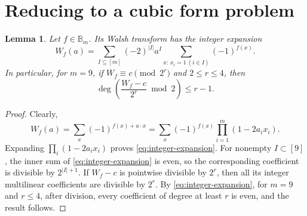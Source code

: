 \documentclass[11pt]{article}
\newtheorem{lemma}{Lemma}
\newtheorem{open problem}{Open problem}
\begin{document}
\section{Reducing to a cubic form problem}
\begin{lemma}\label{lem:residue}
Let $f\in \mathbb{B}_m$. Its Walsh transform has the integer expansion
\begin{equation}\label{eq:integer-expansion}
W_f(a)=\sum_{I\subseteq[m]}(-2)^{|I|}a^I
                 \sum_{x:\,x_i=1\ (i\in I)}(-1)^{f(x)}.
\end{equation}
In particular, for $m=9$, if $W_f\equiv c\pmod{2^r}$ and $2\le r\le4$, then
\begin{equation}\label{eq:residue-degree}
\deg\left(\frac{W_f-c}{2^r}\bmod2\right)\le r-1.
\end{equation}
\end{lemma}
\begin{proof}
Clearly,
\[
W_f(a)=\sum_x(-1)^{f(x)+a\cdot x}=\sum_x(-1)^{f(x)}\prod_{i=1}^m(1-2a_ix_i).
\]
Expanding $\prod_i(1-2a_ix_i)$ proves \eqref{eq:integer-expansion}. For nonempty $I\subset[9]$, the inner sum of \eqref{eq:integer-expansion} is even, so the corresponding coefficient is divisible by $2^{|I|+1}$.
If $W_f-c$ is pointwise divisible by $2^r$, then all its integer multilinear coefficients are divisible by $2^r$. By \eqref{eq:integer-expansion}, for $m=9$ and $r\le 4$, after division, every coefficient of degree at least $r$ is even, and the result follows.
\end{proof}
\end{document}

